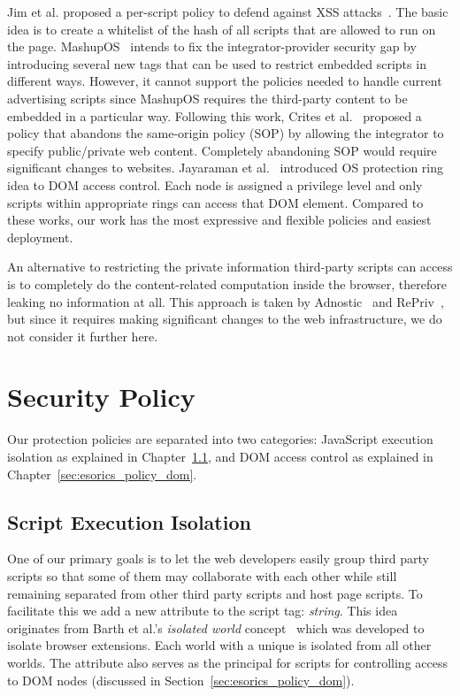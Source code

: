   Jim et al. proposed a per-script policy to defend against XSS attacks~\cite{Beep}. The basic idea is to create a whitelist of the hash of all scripts that are allowed to run on the page.  MashupOS~\cite{MashupOS} intends to fix the integrator-provider security gap by introducing several new tags that can be used to restrict embedded scripts in different ways.  However, it cannot support the policies needed to handle current advertising scripts since MashupOS requires the third-party content to be embedded in a particular way.  Following this work, Crites et al.~\cite{OMash} proposed a policy that abandons the same-origin policy (SOP) by allowing the integrator to specify public/private web content.  Completely abandoning SOP would require significant changes to websites.  Jayaraman et al.~\cite{escudo} introduced OS protection ring idea to DOM access control.  Each node is assigned a privilege level and only scripts within appropriate rings can access that DOM element.  Compared to these works, our work has the most expressive and flexible policies and easiest deployment.

An alternative to restricting the private information third-party scripts can access is to completely do the content-related computation inside the browser, therefore leaking no information at all.  This approach is taken by Adnostic~\cite{Adnostic} and RePriv~\cite{RePriv}, but since it requires making significant changes to the web infrastructure, we do not consider it further here.

\section{Security Policy}
\label{sec:esorics_policy}

Our protection policies are separated into two categories: JavaScript execution isolation as explained in Chapter~\ref{sec:esorics_policy_iso}, and DOM access control as explained in Chapter~\ref{sec:esorics_policy_dom}.

\subsection{Script Execution Isolation} 
\label{sec:esorics_policy_iso}
One of our primary goals is to let the web developers easily group third party scripts so that some of them may collaborate with each other while still remaining separated from other third party scripts and host page scripts.  To facilitate this we add a new attribute to the script tag: \emph{string}.  This idea originates from Barth et al.'s \emph{isolated world} concept~\cite{extension} which was developed to isolate browser extensions.  Each world with a unique  is isolated from all other worlds.  The  attribute also serves as the principal for scripts for controlling access to DOM nodes (discussed in Section~\ref{sec:esorics_policy_dom}).
\lstset{xleftmargin=.25\textwidth,xrightmargin=.1\textwidth}


